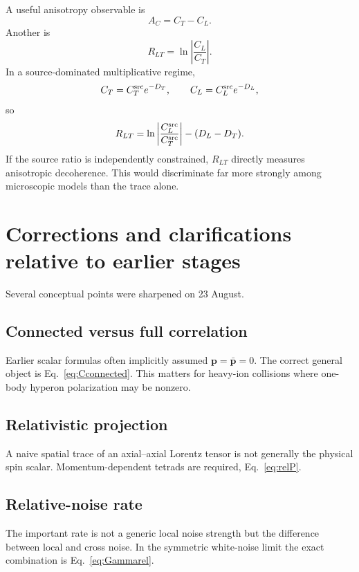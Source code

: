 \documentclass[11pt]{article}
\begin{document}
A useful anisotropy observable is
\begin{equation}
A_C=C_T-C_L.
\end{equation}
Another is
\begin{equation}
R_{LT}=\ln\left|\frac{C_L}{C_T}\right|.
\end{equation}
In a source-dominated multiplicative regime,
\begin{equation}
C_T=C_T^{\rm src}e^{-D_T},
\qquad
C_L=C_L^{\rm src}e^{-D_L},
\end{equation}
so
\begin{equation}
R_{LT}
=\ln\left|\frac{C_L^{\rm src}}{C_T^{\rm src}}\right|
-(D_L-D_T).
\end{equation}
If the source ratio is independently constrained, $R_{LT}$ directly measures anisotropic decoherence. This would discriminate far more strongly among microscopic models than the trace alone.

\section{Corrections and clarifications relative to earlier stages}

Several conceptual points were sharpened on 23 August.

\subsection{Connected versus full correlation}

Earlier scalar formulas often implicitly assumed $\bm p=\bar{\bm p}=0$. The correct general object is Eq.~\eqref{eq:Cconnected}. This matters for heavy-ion collisions where one-body hyperon polarization may be nonzero.

\subsection{Relativistic projection}

A naive spatial trace of an axial--axial Lorentz tensor is not generally the physical spin scalar. Momentum-dependent tetrads are required, Eq.~\eqref{eq:relP}.

\subsection{Relative-noise rate}

The important rate is not a generic local noise strength but the difference between local and cross noise. In the symmetric white-noise limit the exact combination is Eq.~\eqref{eq:Gammarel}.
\end{document}
